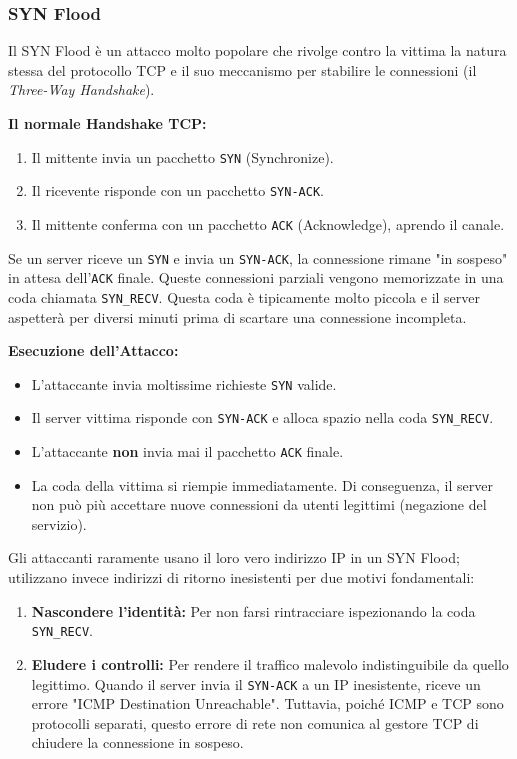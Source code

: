 \documentclass{article}
\begin{document}
\subsubsection*{SYN Flood}

Il SYN Flood è un attacco molto popolare che rivolge contro la vittima la natura stessa del protocollo TCP e il suo meccanismo per stabilire le connessioni (il \textit{Three-Way Handshake}).

\textbf{Il normale Handshake TCP:}
\begin{enumerate}
    \item Il mittente invia un pacchetto \texttt{SYN} (Synchronize).
    \item Il ricevente risponde con un pacchetto \texttt{SYN-ACK}.
    \item Il mittente conferma con un pacchetto \texttt{ACK} (Acknowledge), aprendo il canale.
\end{enumerate}

Se un server riceve un \texttt{SYN} e invia un \texttt{SYN-ACK}, la connessione rimane "in sospeso" in attesa dell'\texttt{ACK} finale. Queste connessioni parziali vengono memorizzate in una coda chiamata \texttt{SYN\_RECV}. Questa coda è tipicamente molto piccola e il server aspetterà per diversi minuti prima di scartare una connessione incompleta.

\textbf{Esecuzione dell'Attacco:}
\begin{itemize}
    \item L'attaccante invia moltissime richieste \texttt{SYN} valide.
    \item Il server vittima risponde con \texttt{SYN-ACK} e alloca spazio nella coda \texttt{SYN\_RECV}.
    \item L'attaccante \textbf{non} invia mai il pacchetto \texttt{ACK} finale.
    \item La coda della vittima si riempie immediatamente. Di conseguenza, il server non può più accettare nuove connessioni da utenti legittimi (negazione del servizio).
\end{itemize}

Gli attaccanti raramente usano il loro vero indirizzo IP in un SYN Flood; utilizzano invece indirizzi di ritorno inesistenti per due motivi fondamentali:
\begin{enumerate}
    \item \textbf{Nascondere l'identità:} Per non farsi rintracciare ispezionando la coda \texttt{SYN\_RECV}.
    \item \textbf{Eludere i controlli:} Per rendere il traffico malevolo indistinguibile da quello legittimo. Quando il server invia il \texttt{SYN-ACK} a un IP inesistente, riceve un errore "ICMP Destination Unreachable". Tuttavia, poiché ICMP e TCP sono protocolli separati, questo errore di rete non comunica al gestore TCP di chiudere la connessione in sospeso.
\end{enumerate}
\end{document}
